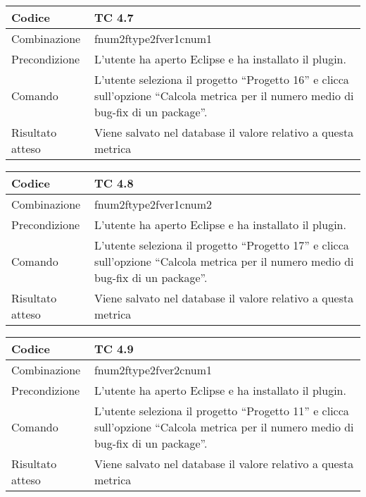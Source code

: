 \begin{table}[ht]
\begin{tabular}{|p{3cm}|p{9cm}|}
\hline
\cellcolor{lightgray}Codice				& TC 4.7								\\
\hline
\cellcolor{lightgray}Combinazione		& fnum2ftype2fver1cnum1							\\
\hline
\cellcolor{lightgray}Precondizione		& L'utente ha aperto Eclipse e ha installato il plugin.									\\
\hline
\cellcolor{lightgray}Comando			& L'utente seleziona il progetto ``Progetto 16''  e clicca sull'opzione ``Calcola metrica per il numero medio di bug-fix di un package''.	\\
\hline
\cellcolor{lightgray}Risultato atteso	& Viene salvato nel database il valore relativo a questa metrica	\\
\hline
\end{tabular}
\end{table}

\begin{table}[ht]
\begin{tabular}{|p{3cm}|p{9cm}|}
\hline
\cellcolor{lightgray}Codice				& TC 4.8								\\
\hline
\cellcolor{lightgray}Combinazione		& fnum2ftype2fver1cnum2 									\\
\hline
\cellcolor{lightgray}Precondizione		& L'utente ha aperto Eclipse e ha installato il plugin.				\\
\hline
\cellcolor{lightgray}Comando			& L'utente seleziona il progetto ``Progetto 17''  e clicca sull'opzione ``Calcola metrica per il numero medio di bug-fix di un package''.	\\
\hline
\cellcolor{lightgray}Risultato atteso	& Viene salvato nel database il valore relativo a questa metrica	\\
\hline
\end{tabular}
\end{table}

\begin{table}[ht]
\begin{tabular}{|p{3cm}|p{9cm}|}
\hline
\cellcolor{lightgray}Codice				& TC 4.9								\\
\hline
\cellcolor{lightgray}Combinazione		& fnum2ftype2fver2cnum1 									\\
\hline
\cellcolor{lightgray}Precondizione		& L'utente ha aperto Eclipse e ha installato il plugin.								\\
\hline
\cellcolor{lightgray}Comando			& L'utente seleziona il progetto ``Progetto 11''  e clicca sull'opzione ``Calcola metrica per il numero medio di bug-fix di un package''.	\\
\hline
\cellcolor{lightgray}Risultato atteso	& Viene salvato nel database il valore relativo a questa metrica	\\
\hline
\end{tabular}
\end{table}

